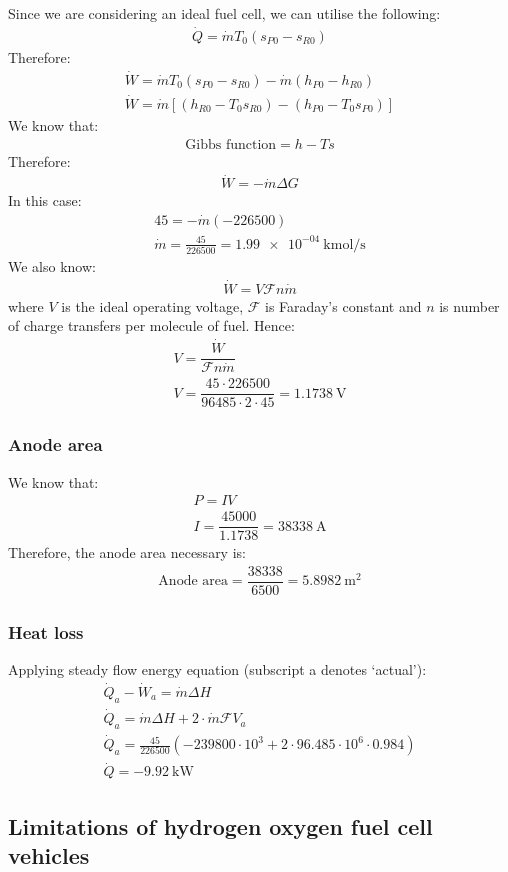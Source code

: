 \documentclass[11pt]{article}
\numberwithin{equation}{section}
\begin{document}
Since we are considering an ideal fuel cell, we can utilise the following:
\begin{gather}
    \dot{Q} = \dot{m}T_0\left(s_{P0} - s_{R0}\right)
\end{gather}
Therefore:
\begin{gather}
    \dot{W} = \dot{m}T_0 \left(s_{P0} - s_{R0}\right) - \dot{m}\left(h_{P0}-h_{R0}\right)\\
    \dot{W} = \dot{m}\left[\left(h_{R0} - T_0s_{R0}\right)-\left(h_{P0}-T_0s_{P0}\right)\right]
\end{gather}
We know that:
\begin{gather}
    \textrm{Gibbs function} = h- Ts
\end{gather}
Therefore:
\begin{gather}
    \dot{W} = -\dot{m}\Delta G  
\end{gather}
In this case:
\begin{gather}
    45 = - \dot{m} \left(-226500\right)\\
    \dot{m} = \frac{45}{226500} = \SI{1.99e-04}{\kilo\mol\per\second}
\end{gather}
We also know:
\begin{gather}
    \dot{W} = V\mathcal{F}n\dot{m}
\end{gather}
where $V$ is the ideal operating voltage, $\mathcal{F}$ is Faraday's constant and $n$ is number of charge transfers per molecule of fuel. Hence:
\begin{gather}
    V = \dfrac{\dot{W}}{\mathcal{F}n\dot{m}}\\
    V = \dfrac{45\cdot 226500}{96485\cdot 2 \cdot 45} = \SI{1.1738}{\volt}
\end{gather}
\subsubsection{Anode area}
We know that:
\begin{gather}
    P = IV\\
    I = \dfrac{45000}{1.1738} = \SI{38338}{\ampere}
\end{gather}
Therefore, the anode area necessary is:
\begin{gather}
    \textrm{Anode area} = \dfrac{38338}{6500} = \SI{5.8982}{\meter\squared}
\end{gather}
\subsubsection{Heat loss}
Applying steady flow energy equation (subscript a denotes `actual'):
\begin{gather}
    \dot{Q}_a - \dot{W}_a = \dot{m}\Delta H\\
    \dot{Q}_a = \dot{m}\Delta H + 2 \cdot \dot{m} \mathcal{F}V_{a}\\
    \dot{Q}_a = \frac{45}{226500}\left(-239800\cdot 10^3 + 2\cdot 96.485\cdot 10^6 \cdot 0.984\right)\\
    \dot{Q} = \SI{-9.92}{\kilo\watt}
\end{gather}
\subsection{Limitations of hydrogen oxygen fuel cell vehicles}
\end{document}
